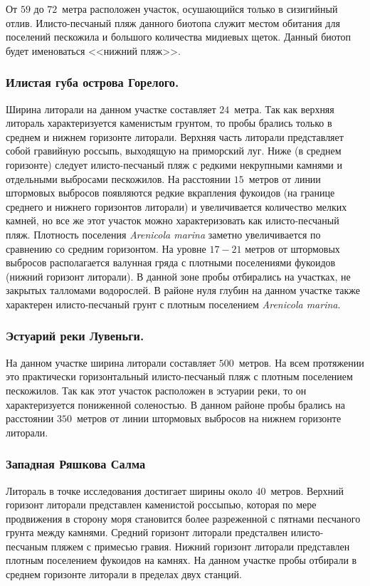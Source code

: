 От $59$ до $72$~метра расположен участок, осушающийся только в сизигийный отлив. 
Илисто-песчаный пляж данного биотопа служит местом обитания для поселений пескожила и большого количества мидиевых щеток. 
Данный биотоп будет именоваться <<нижний пляж>>. 


\subsubsection{Илистая губа острова Горелого.}
Ширина литорали на данном участке составляет $24$~метра. 
Так как верхняя литораль характеризуется каменистым грунтом, то пробы брались только в среднем и нижнем горизонте литорали.
Верхняя часть литорали представляет собой гравийную россыпь, выходящую на приморский луг. 
Ниже (в среднем горизонте) следует илисто-песчаный пляж с редкими некрупными камнями и отдельными выбросами пескожилов.  
На расстоянии $15$~метров от линии штормовых выбросов появляются редкие вкрапления фукоидов (на границе среднего и нижнего горизонтов литорали) и увеличивается количество мелких камней, но  все же этот участок можно характеризовать как илисто-песчаный пляж. 
Плотность поселения {\it Arenicola marina} заметно увеличивается по сравнению со средним горизонтом.
На уровне $17-21$ метров от штормовых выбросов располагается валунная гряда с плотными поселениями фукоидов (нижний горизонт литорали). 
В данной зоне пробы отбирались на участках, не закрытых талломами водорослей. 
В районе нуля глубин на данном участке также характерен илисто-песчаный грунт с плотным поселением {\it Arenicola marina}.


\subsubsection{Эстуарий реки Лувеньги.}
На данном участке ширина литорали составляет $500$~метров. 
На всем протяжении это практически горизонтальный илисто-песчаный пляж с плотным поселением пескожилов. 
Так как этот участок расположен в эстуарии реки, то он характеризуется пониженной соленостью. 
В данном районе пробы брались на расстоянии $350$~метров от линии штормовых выбросов на нижнем горизонте литорали.

\subsubsection{Западная Ряшкова Салма}
Литораль в точке исследования достигает ширины около $40$~метров.
Верхний горизонт литорали представлен каменистой россыпью, которая по мере продвижения в сторону моря становится более разреженной с пятнами песчаного грунта между камнями.
Средний горизонт литорали предсталвен илисто-песчаным пляжем с примесью гравия.
Нижний горизонт литорали представлен плотным поселением фукоидов на камнях.
На данном участке пробы отбирали в среднем горизонте литорали в пределах двух станций.


